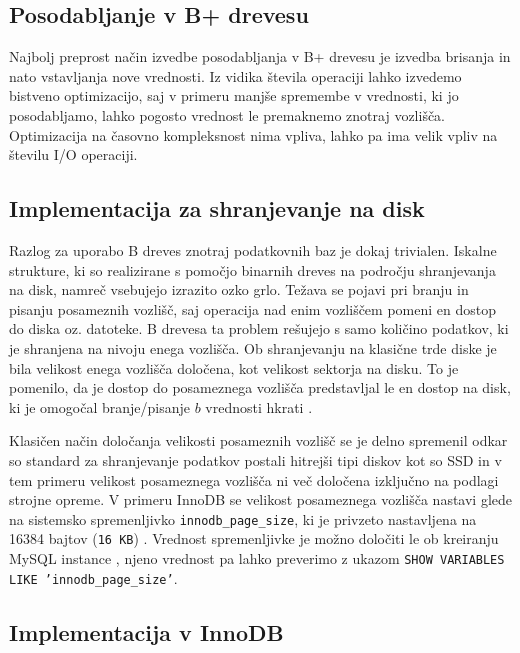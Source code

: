 \documentclass[a4paper,12pt,openright]{book}
\begin{document}
        \subsection{Posodabljanje v B+ drevesu}

        Najbolj preprost način izvedbe posodabljanja v B+ drevesu je izvedba brisanja in nato vstavljanja nove vrednosti. Iz vidika števila operaciji lahko izvedemo bistveno optimizacijo, saj v primeru manjše spremembe v vrednosti, ki jo posodabljamo, lahko pogosto vrednost le premaknemo znotraj vozlišča. Optimizacija na časovno kompleksnost nima vpliva, lahko pa ima velik vpliv na številu I/O operaciji.

        \subsection{Implementacija za shranjevanje na disk}
        Razlog za uporabo B dreves znotraj podatkovnih baz je dokaj trivialen. Iskalne strukture, ki so realizirane s pomočjo binarnih dreves na področju shranjevanja na disk, namreč vsebujejo izrazito ozko grlo. Težava se pojavi pri branju in pisanju posameznih vozlišč, saj operacija nad enim vozliščem pomeni en dostop do diska oz. datoteke. B drevesa ta problem rešujejo s samo količino podatkov, ki je shranjena na nivoju enega vozlišča. Ob shranjevanju na klasične trde diske je bila velikost enega vozlišča določena, kot velikost sektorja na disku. To je pomenilo, da je dostop do posameznega vozlišča predstavljal le en dostop na disk, ki je omogočal branje/pisanje $b$ vrednosti hkrati \cite{goodrich2011data}.

        Klasičen način določanja velikosti posameznih vozlišč se je delno spremenil odkar so standard za shranjevanje podatkov postali hitrejši tipi diskov kot so SSD in v tem primeru velikost posameznega vozlišča ni več določena izključno na podlagi strojne opreme. V primeru InnoDB se velikost posameznega vozlišča nastavi glede na sistemsko spremenljivko {\tt innodb\_page\_size}, ki je privzeto nastavljena na \num{16384} bajtov ({\tt 16 KB}) \cite{INOODB_PS}. Vrednost spremenljivke je možno določiti le ob kreiranju MySQL instance \cite{MYSQL_SETUP}, njeno vrednost pa lahko preverimo z ukazom {\tt SHOW VARIABLES LIKE 'innodb\_page\_size'}.

        \subsection{Implementacija v InnoDB}
        \label{MYSQL_BPTREE}
\end{document}
